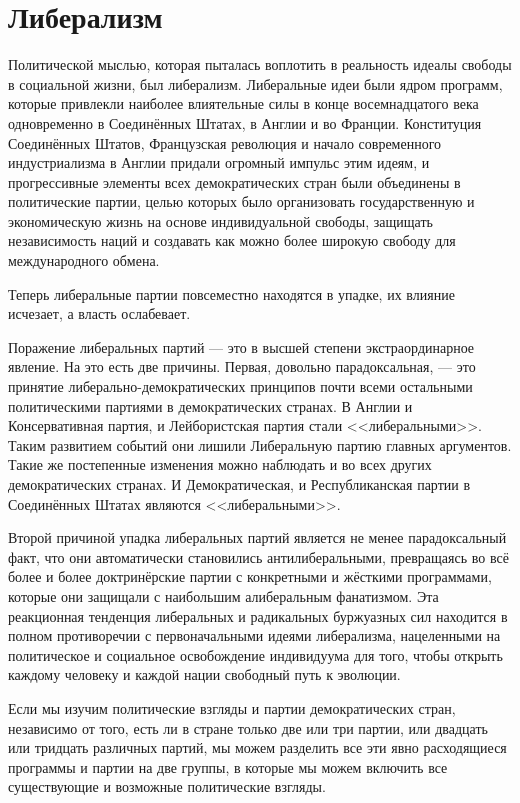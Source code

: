 \chapter{Либерализм}

Политической мыслью, которая пыталась воплотить в реальность идеалы свободы в социальной жизни, был либерализм. Либеральные идеи были ядром программ, которые привлекли наиболее влиятельные силы в конце восемнадцатого века одновременно в Соединённых Штатах, в Англии и во Франции. Конституция Соединённых Штатов, Французская революция и начало современного индустриализма в Англии придали огромный импульс этим идеям, и прогрессивные элементы всех демократических стран были объединены в политические партии, целью которых было организовать государственную и экономическую жизнь на основе индивидуальной свободы, защищать независимость наций и создавать как можно более широкую свободу для международного обмена.
 
Теперь либеральные партии повсеместно находятся в упадке, их влияние исчезает, а власть ослабевает.
 
Поражение либеральных партий — это в высшей степени экстраординарное явление. На это есть две причины. Первая, довольно парадоксальная, — это принятие либерально-демократических принципов почти всеми остальными политическими партиями в демократических странах. В Англии и Консервативная партия, и Лейбористская партия стали <<либеральными>>. Таким развитием событий они лишили Либеральную партию главных аргументов. Такие же постепенные изменения можно наблюдать и во всех других демократических странах. И Демократическая, и Республиканская партии в Соединённых Штатах являются <<либеральными>>.

Второй причиной упадка либеральных партий является не менее парадоксальный факт, что они автоматически становились антилиберальными, превращаясь во всё более и более доктринёрские партии с конкретными и жёсткими программами, которые они защищали с наибольшим алиберальным фанатизмом. Эта реакционная тенденция либеральных и радикальных буржуазных сил находится в полном противоречии с первоначальными идеями либерализма, нацеленными на политическое и социальное освобождение индивидуума для того, чтобы открыть каждому человеку и каждой нации свободный путь к эволюции.

Если мы изучим политические взгляды и партии демократических стран, независимо от того, есть ли в стране только две или три партии, или двадцать или тридцать различных партий, мы можем разделить все эти явно расходящиеся программы и партии на две группы, в которые мы можем включить все существующие и возможные политические взгляды.


